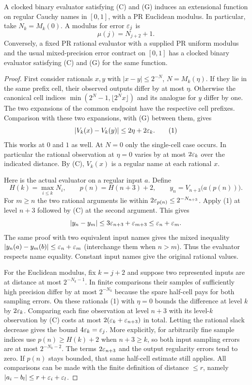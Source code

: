 \begin{theorem}\label{thm:interval}
A clocked binary evaluator satisfying (C) and (G) induces an extensional function on regular Cauchy names in $[0,1]$, with a PR Euclidean modulus. In particular, take $N_k=M_k(0)$. A modulus for error $\varepsilon_j$ is
\[
                    \mu(j)=N_{j+2}+1 .
\]
Conversely, a fixed PR rational evaluator with a supplied PR uniform modulus and the usual mixed-precision error contract on $[0,1]$ has a clocked binary evaluator satisfying (C) and (G) for the same function.
\end{theorem}
\begin{proof}
First consider rationals $x,y$ with $|x-y|\le 2^{-N}$, $N=M_k(\eta)$. If they lie in the same prefix cell, their observed outputs differ by at most $\eta$. Otherwise the canonical cell indices $\min(2^N-1,\lfloor 2^Nx\rfloor)$ and its analogue for $y$ differ by one. The two expansions of the common endpoint have the respective cell prefixes. Comparison with these two expansions, with (G) between them, gives
\begin{equation}
            |V_k(x)-V_k(y)|\le 2\eta+2\varepsilon_k.             \tag{1}\label{eq:adj}
\end{equation}
This works at $0$ and $1$ as well. At $N=0$ only the single-cell case occurs. In particular the rational observation at $\eta=0$ varies by at most $2\varepsilon_k$ over the indicated distance. By (C), $V_k(x)$ is a regular name at each rational $x$.

Here is the actual evaluator on a regular input $a$. Define
\[
 H(k)=\max_{i\le k}N_i,\qquad p(n)=H(n+3)+2,\qquad
                         y_n=V_{n+3}\bigl(a(p(n))\bigr).
\]
For $m\ge n$ the two rational arguments lie within $2\varepsilon_{p(n)}\le 2^{-N_{n+3}}$. Apply (1) at level $n+3$ followed by (C) at the second argument. This gives
\[
                |y_n-y_m|\le3\varepsilon_{n+3}+\varepsilon_{m+3}
                         \le\varepsilon_n+\varepsilon_m .
\]
The same proof with two equivalent input names gives the mixed inequality $|y_n(a)-y_m(b)|\le\varepsilon_n+\varepsilon_m$ (interchange them when $n>m$). Thus the evaluator respects name equality. Constant input names give the original rational values.

For the Euclidean modulus, fix $k=j+2$ and suppose two represented inputs are at distance at most $2^{-N_k-1}$. In finite comparisons their samples of sufficiently high precision differ by at most $2^{-N_k}$ because the spare half-cell pays for both sampling errors. On these rationals (1) with $\eta=0$ bounds the difference at level $k$ by $2\varepsilon_k$. Comparing each fine observation at level $n+3$ with its level-$k$ observation by (C) costs at most $2(\varepsilon_k+\varepsilon_{n+3})$ in total. Letting the rational slack decrease gives the bound $4\varepsilon_k=\varepsilon_j$. More explicitly, for arbitrarily fine sample indices use $p(n)\ge H(k)+2$ when $n+3\ge k$, so both input sampling errors are at most $2^{-N_k-2}$. The terms $2\varepsilon_{n+3}$ and the output regularity errors tend to zero. If $p(n)$ stays bounded, that same half-cell estimate still applies. All comparisons can be made with the finite definition of distance $\le r$, namely $|a_i-b_l|\le r+\varepsilon_i+\varepsilon_l$.


\end{proof}
